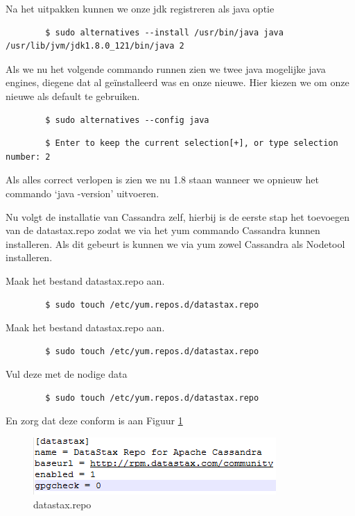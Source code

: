 \documentclass{article}
\begin{document}
	\par
	Na het uitpakken kunnen we onze jdk registreren als java optie
	\begin{lstlisting}
		$ sudo alternatives --install /usr/bin/java java /usr/lib/jvm/jdk1.8.0_121/bin/java 2
	\end{lstlisting}
	
	\par
	Als we nu het volgende commando runnen zien we twee java mogelijke java engines, diegene dat al geïnstalleerd was en onze nieuwe. 
	Hier kiezen we om onze nieuwe als default te gebruiken.
	\begin{lstlisting}
		$ sudo alternatives --config java
	\end{lstlisting}
	\begin{lstlisting}
		$ Enter to keep the current selection[+], or type selection number: 2
	\end{lstlisting}
	
	\par
	Als alles correct verlopen is zien we nu 1.8 staan wanneer we opnieuw het commando ‘java -version’ uitvoeren.
	
	\par
	Nu volgt de installatie van Cassandra zelf, hierbij is de eerste stap het toevoegen van de datastax.repo zodat we via het yum commando Cassandra kunnen installeren.
	 Als dit gebeurt is kunnen we via yum zowel Cassandra als Nodetool installeren.
	\par
	Maak het bestand datastax.repo aan.
	\begin{lstlisting}
		$ sudo touch /etc/yum.repos.d/datastax.repo
	\end{lstlisting}
	
	\par
	Maak het bestand datastax.repo aan.
	\begin{lstlisting}
		$ sudo touch /etc/yum.repos.d/datastax.repo
	\end{lstlisting}
	
	\par
	Vul deze met de nodige data
	\begin{lstlisting}
		$ sudo touch /etc/yum.repos.d/datastax.repo
	\end{lstlisting}
	En zorg dat deze conform is aan Figuur \ref{fig:datastax.repo}
	\begin{figure}[h!]
  		\includegraphics[width=\linewidth]{images/datastax-repo.PNG}
  		\caption{datastax.repo}
  		\label{fig:datastax.repo}
	\end{figure}
	
\end{document}
